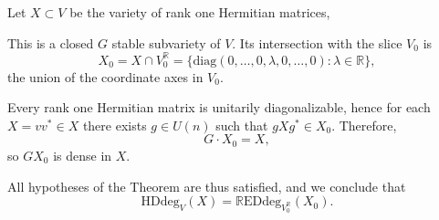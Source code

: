 \documentclass[11pt]{amsart}
\def\R{\mathbb R}\let\er\R
\theoremstyle{plain}
\theoremstyle{definition}
\theoremstyle{remark}
\begin{document}
Let $X \subset V$ be the variety of rank one Hermitian matrices,

This is a closed $G$ stable subvariety of $V$.  Its intersection with the slice
$V_0$ is
\[
X_0 = X \cap V_0^{\R}
= \{ \mathrm{diag}(0,\dots,0,\lambda,0,\dots,0) : \lambda \in \mathbb{R} \},
\]
the union of the coordinate axes in $V_0$.  

Every rank one Hermitian matrix is unitarily diagonalizable, hence for each
$X = vv^{\ast} \in X$ there exists $g \in U(n)$ such that 
$gXg^{\ast} \in X_0$.  
Therefore,
\[
G \cdot X_0 = X,
\]
so $G X_0$ is dense in $X$.

All hypotheses of the  Theorem are thus satisfied, and we conclude that
\[
\mathrm{HDdeg}_{V}(X) = \mathrm{\mathbb{R}EDdeg}_{V_0^\mathbb{R}}(X_0).
\]



\newpage



  
\end{document}
